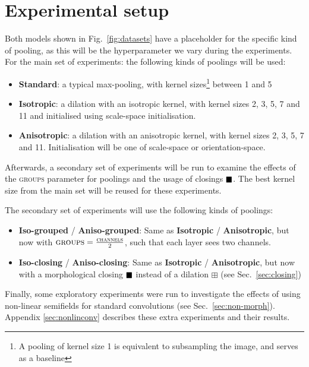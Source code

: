 \documentclass[a4paper, 12pt]{report}
\DeclareMathOperator{\boxclose}{\vcenter{\hbox{$\blacksquare$}}}
\begin{document}
\newpage
\section{Experimental setup}
\label{sec:setup}
Both models shown in Fig.\ \ref{fig:datasets} have a placeholder for the specific kind of pooling, as this will be the hyperparameter we vary during the experiments.
For the main set of experiments: the following kinds of poolings will be used:
\begin{itemize}
\vspace{-0.1cm}
\setlength{\itemsep}{0pt}
	\item \textbf{Standard}: a typical max-pooling, with kernel sizes\footnote{A pooling of kernel size 1 is equivalent to subsampling the image, and serves as a baseline} between 1 and 5
	\item \textbf{Isotropic}: a dilation with an isotropic kernel, with kernel sizes 2, 3, 5, 7 and 11 and initialised using scale-space initialisation.
	\item \textbf{Anisotropic}: a dilation with an anisotropic kernel, with kernel sizes 2, 3, 5, 7 and 11. Initialisation will be one of scale-space or orientation-space.
\end{itemize}
\vspace{-0.1cm}
Afterwards, a secondary set of experiments will be run to examine the effects of the \textsc{groups} parameter for poolings and the usage of closings $\boxclose$. The best kernel size from the main set will be reused for these experiments.

The secondary set of experiments will use the following kinds of poolings:
\begin{itemize}
\vspace{-0.1cm}
\setlength{\itemsep}{0pt}
	\item \textbf{Iso-grouped} / \textbf{Aniso-grouped}: Same as \textbf{Isotropic} / \textbf{Anisotropic}, but now with $\textsc{groups}=\frac{\textsc{channels}}{2}$, such that each layer sees two channels.
	\item \textbf{Iso-closing} / \textbf{Aniso-closing}: Same as \textbf{Isotropic} / \textbf{Anisotropic}, but now with a morphological closing $\boxclose$ instead of a dilation $\boxplus$ (see Sec.\ \ref{sec:closing})
\end{itemize}
\vspace{-0.1cm}
Finally, some exploratory experiments were run to investigate the effects of using non-linear semifields for standard convolutions (see Sec.\ \ref{sec:non-morph}). Appendix \ref{sec:nonlinconv} describes these extra experiments and their results.
\end{document}
